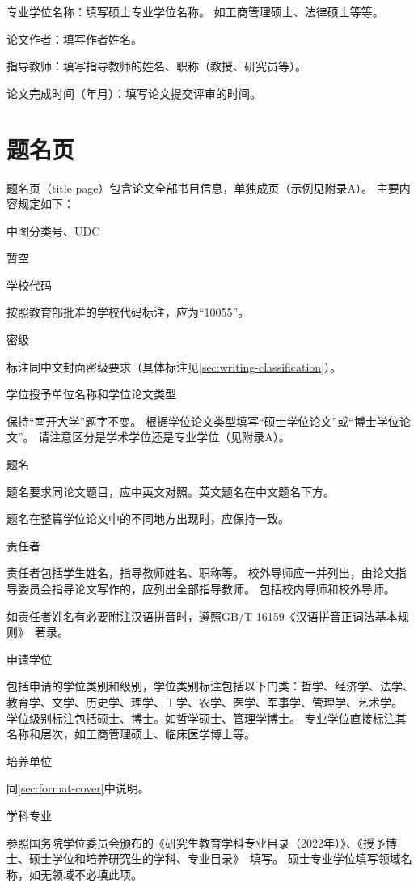 {\heiti 专业学位名称：}填写硕士专业学位名称。
如工商管理硕士、法律硕士等等。

{\heiti 论文作者：}填写作者姓名。

{\heiti 指导教师：}填写指导教师的姓名、职称（教授、研究员等）。

{\heiti 论文完成时间（年月）：}填写论文提交评审的时间。

\section{题名页}

题名页（title page）包含论文全部书目信息，单独成页（示例见附录A）。
主要内容规定如下：

{\heiti 中图分类号、UDC}

暂空

{\heiti 学校代码}

按照教育部批准的学校代码标注，应为“10055”。

{\heiti 密级}

标注同中文封面密级要求（具体标注见\ref{sec:writing-classification}）。

{\heiti 学位授予单位名称和学位论文类型}

保持“南开大学”题字不变。
根据学位论文类型填写“硕士学位论文”或“博士学位论文”。
请注意区分是学术学位还是专业学位（见附录A）。

{\heiti 题名}

题名要求同论文题目，应中英文对照。英文题名在中文题名下方。

题名在整篇学位论文中的不同地方出现时，应保持一致。

{\heiti 责任者}

责任者包括学生姓名，指导教师姓名、职称等。
校外导师应一并列出，由论文指导委员会指导论文写作的，应列出全部指导教师。
包括校内导师和校外导师。

如责任者姓名有必要附注汉语拼音时，遵照GB/T 16159《汉语拼音正词法基本规则》~\cite{SCSF00038519}著录。

{\heiti 申请学位}

包括申请的学位类别和级别，学位类别标注包括以下门类：哲学、经济学、法学、教育学、文学、历史学、理学、工学、农学、医学、军事学、管理学、艺术学。
学位级别标注包括硕士、博士。如哲学硕士、管理学博士。
专业学位直接标注其名称和层次，如工商管理硕士、临床医学博士等。

{\heiti 培养单位}

同\ref{sec:format-cover}中说明。

{\heiti 学科专业}

参照国务院学位委员会颁布的《研究生教育学科专业目录（2022年）》、《授予博士、硕士学位和培养研究生的学科、专业目录》~\cite{REF00000002}填写。
硕士专业学位填写领域名称，如无领域不必填此项。

